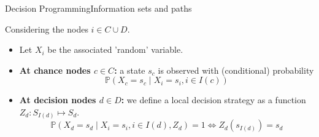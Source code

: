 \documentclass[mathserif,aspectratio=149]{beamer}
\begin{document}
\begin{frame}{Decision Programming}{Information sets and paths}

Considering the nodes $i \in C \cup D$.
\begin{itemize}[<+->]
    \item Let $X_i$ be the associated 'random' variable.
    \item {\bf At chance nodes $c \in C$:} a state $s_c$ is observed with (conditional) \alert{probability} 
    $$ \mathbb{P}(X_c = s_c \mid X_i = s_i, i \in I(c)) $$
    \item {\bf At decision nodes $d \in D$:} we define a \alert{local decision strategy} as a function $Z_d : S_{I(d)} \mapsto S_d$.
    $$ \mathbb{P}(X_d = s_d \mid X_i = s_i, i \in I(d), Z_d) = 1 \iff Z_d(s_{I(d)}) = s_d $$
\end{itemize}
%
\vspace{-24pt}

\end{frame}
\end{document}
